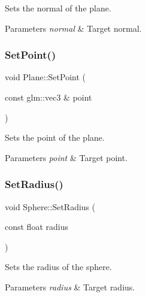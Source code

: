 Sets the normal of the plane. 
\begin{DoxyParams}{Parameters}
{\em normal} & Target normal. \\
\hline
\end{DoxyParams}
\hypertarget{group___geometric_objects_ga8fdaa0574a2046f2e280e6c926f7947d}{}\label{group___geometric_objects_ga8fdaa0574a2046f2e280e6c926f7947d} 
\subsubsection{\texorpdfstring{Set\+Point()}{SetPoint()}}
{\footnotesize\ttfamily void Plane\+::\+Set\+Point (\begin{DoxyParamCaption}\item[{const glm\+::vec3 \&}]{point }\end{DoxyParamCaption})\hspace{0.3cm}{\ttfamily [inline]}}

Sets the point of the plane. 
\begin{DoxyParams}{Parameters}
{\em point} & Target point. \\
\hline
\end{DoxyParams}
\hypertarget{group___geometric_objects_ga0377e69b4a636f542c30c6fa977399e3}{}\label{group___geometric_objects_ga0377e69b4a636f542c30c6fa977399e3} 
\subsubsection{\texorpdfstring{Set\+Radius()}{SetRadius()}}
{\footnotesize\ttfamily void Sphere\+::\+Set\+Radius (\begin{DoxyParamCaption}\item[{const float}]{radius }\end{DoxyParamCaption})\hspace{0.3cm}{\ttfamily [inline]}}

Sets the radius of the sphere. 
\begin{DoxyParams}{Parameters}
{\em radius} & Target radius. \\
\hline
\end{DoxyParams}
